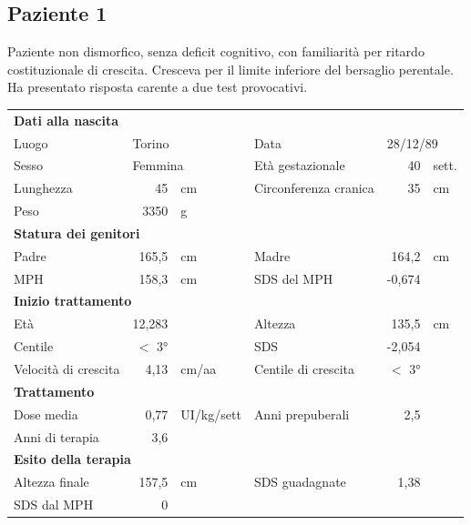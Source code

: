 \clearpage

\subsection*{Paziente 1} %

Paziente non dismorfico, senza deficit cognitivo, con familiarità per ritardo costituzionale di crescita. 
Cresceva per il limite inferiore del bersaglio perentale.
Ha presentato risposta carente a due test provocativi.

\begin{table}[!h]
\begin{tabular}{lrllrl}
\toprule
\multicolumn{6}{l}{\textbf{Dati alla nascita}}\\
Luogo 		& \multicolumn{2}{l}{Torino} 	& Data 					& \multicolumn{2}{l}{28/12/89} 	\\
Sesso 		& \multicolumn{2}{l}{Femmina} 	& Età gestazionale 		& 40 		& sett.\\
Lunghezza 	& 45 		& cm 				& Circonferenza cranica	& 35 		& cm\\
Peso 		& 3350 		& g\\
\midrule
\multicolumn{6}{l}{\textbf{Statura dei genitori}}\\
Padre 		& 165,5 & cm 	& Madre 				& 164,2 & cm \\
MPH 		& 158,3 & cm 	& SDS del MPH 			& -0,674\\
\midrule
\multicolumn{6}{l}{\textbf{Inizio trattamento}} \\
Età	& 12,283 & 		& Altezza 				& 135,5 & cm  \\
Centile & $<$ 3° 	 &		& SDS		& -2,054 \\
Velocità di crescita & 4,13 & cm/aa	& Centile di crescita & $<$ 3°\\
\midrule
\multicolumn{6}{l}{\textbf{Trattamento}} \\
Dose media		& 0,77 & UI/kg/sett & Anni prepuberali & 2,5\\
Anni di terapia & 3,6\\
\midrule
\multicolumn{6}{l}{\textbf{Esito della terapia}} \\
Altezza finale			& 157,5 & cm 	& SDS guadagnate 			& 1,38\\
SDS dal MPH	& 0 	&		& & \\
\bottomrule
\end{tabular}
\end{table}
\clearpage

